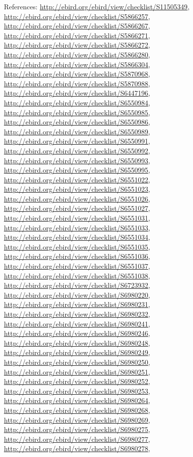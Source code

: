 \documentclass[9pt, article]{memoir}
\begin{document}
\begin{multicols}{2}
\vspace{6pt}References: 
\url{http://ebird.org/ebird/view/checklist/S11505349}, 
\url{http://ebird.org/ebird/view/checklist/S5866257}, 
\url{http://ebird.org/ebird/view/checklist/S5866267}, 
\url{http://ebird.org/ebird/view/checklist/S5866271}, 
\url{http://ebird.org/ebird/view/checklist/S5866272}, 
\url{http://ebird.org/ebird/view/checklist/S5866280}, 
\url{http://ebird.org/ebird/view/checklist/S5866304}, 
\url{http://ebird.org/ebird/view/checklist/S5870968}, 
\url{http://ebird.org/ebird/view/checklist/S5870988}, 
\url{http://ebird.org/ebird/view/checklist/S6447196}, 
\url{http://ebird.org/ebird/view/checklist/S6550984}, 
\url{http://ebird.org/ebird/view/checklist/S6550985}, 
\url{http://ebird.org/ebird/view/checklist/S6550986}, 
\url{http://ebird.org/ebird/view/checklist/S6550989}, 
\url{http://ebird.org/ebird/view/checklist/S6550991}, 
\url{http://ebird.org/ebird/view/checklist/S6550992}, 
\url{http://ebird.org/ebird/view/checklist/S6550993}, 
\url{http://ebird.org/ebird/view/checklist/S6550995}, 
\url{http://ebird.org/ebird/view/checklist/S6551022}, 
\url{http://ebird.org/ebird/view/checklist/S6551023}, 
\url{http://ebird.org/ebird/view/checklist/S6551026}, 
\url{http://ebird.org/ebird/view/checklist/S6551027}, 
\url{http://ebird.org/ebird/view/checklist/S6551031}, 
\url{http://ebird.org/ebird/view/checklist/S6551033}, 
\url{http://ebird.org/ebird/view/checklist/S6551034}, 
\url{http://ebird.org/ebird/view/checklist/S6551035}, 
\url{http://ebird.org/ebird/view/checklist/S6551036}, 
\url{http://ebird.org/ebird/view/checklist/S6551037}, 
\url{http://ebird.org/ebird/view/checklist/S6551038}, 
\url{http://ebird.org/ebird/view/checklist/S6723932}, 
\url{http://ebird.org/ebird/view/checklist/S6980220}, 
\url{http://ebird.org/ebird/view/checklist/S6980231}, 
\url{http://ebird.org/ebird/view/checklist/S6980232}, 
\url{http://ebird.org/ebird/view/checklist/S6980241}, 
\url{http://ebird.org/ebird/view/checklist/S6980246}, 
\url{http://ebird.org/ebird/view/checklist/S6980248}, 
\url{http://ebird.org/ebird/view/checklist/S6980249}, 
\url{http://ebird.org/ebird/view/checklist/S6980250}, 
\url{http://ebird.org/ebird/view/checklist/S6980251}, 
\url{http://ebird.org/ebird/view/checklist/S6980252}, 
\url{http://ebird.org/ebird/view/checklist/S6980253}, 
\url{http://ebird.org/ebird/view/checklist/S6980264}, 
\url{http://ebird.org/ebird/view/checklist/S6980268}, 
\url{http://ebird.org/ebird/view/checklist/S6980269}, 
\url{http://ebird.org/ebird/view/checklist/S6980275}, 
\url{http://ebird.org/ebird/view/checklist/S6980277}, 
\url{http://ebird.org/ebird/view/checklist/S6980278}, 

\end{multicols}
\end{document}
